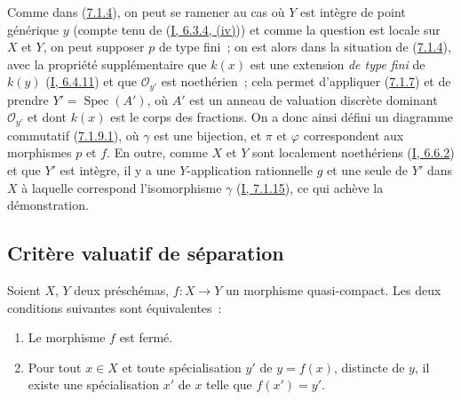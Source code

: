 Comme dans (\hyperref[II.7.1.4-fr]{7.1.4}), on peut se ramener au cas où $Y$
est intègre de point générique $y$ (compte tenu de
(\hyperref[I.6.3.4-fr]{I, 6.3.4, (iv)})) et comme la question est locale sur
$X$ et $Y$, on peut supposer $p$ de type fini~; on est alors dans la situation
de (\hyperref[II.7.1.4-fr]{7.1.4}), avec la propriété supplémentaire que
$k(x)$ est une extension \emph{de type fini} de $k(y)$
(\hyperref[I.6.4.11-fr]{I, 6.4.11}) et que $\mathcal{O}_{y'}$ est noethérien~;
cela permet d'appliquer (\hyperref[II.7.1.7-fr]{7.1.7}) et de prendre
$Y'=\operatorname{Spec}(A')$, où $A'$ est un anneau de valuation discrète
dominant $\mathcal{O}_{y'}$ et dont $k(x)$ est le corps des fractions. On a
donc ainsi défini un diagramme commutatif
(\hyperref[II.7.1.9.1-fr]{7.1.9.1}), où $\gamma$ est une bijection, et $\pi$
et $\varphi$ correspondent aux morphismes $p$ et $f$. En outre, comme $X$ et
$Y$ sont localement noethériens (\hyperref[I.6.6.2-fr]{I, 6.6.2}) et que $Y'$
est intègre, il y a une $Y$-application rationnelle $g$ et une seule de $Y'$
dans $X$ à laquelle correspond l'isomorphisme $\gamma$
(\hyperref[I.7.1.15-fr]{I, 7.1.15}), ce qui achève la démonstration.

\subsection{Critère valuatif de séparation}
\label{subsection:II.7.2-fr}

\begin{proposition}[7.2.1]
\label{II.7.2.1-fr}
Soient $X$, $Y$ deux préschémas, $f:X\to Y$ un morphisme quasi-compact. Les
deux conditions suivantes sont équivalentes~:
\begin{enumerate}
\item[\rm a)] Le morphisme $f$ est fermé.
\item[\rm b)] Pour tout $x\in X$ et toute spécialisation $y'$ de $y=f(x)$,
distincte de $y$, il existe une spécialisation $x'$ de $x$ telle que
$f(x')=y'$.
\end{enumerate}
\end{proposition}

